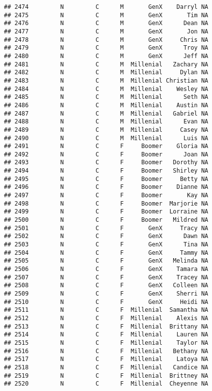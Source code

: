 \documentclass[
]{article}
\begin{document}
\begin{verbatim}
## 2474         N         C      M       GenX    Darryl NA
## 2475         N         C      M       GenX       Tim NA
## 2476         N         C      M       GenX      Dean NA
## 2477         N         C      M       GenX       Jon NA
## 2478         N         C      M       GenX     Chris NA
## 2479         N         C      M       GenX      Troy NA
## 2480         N         C      M       GenX      Jeff NA
## 2481         N         C      M  Millenial   Zachary NA
## 2482         N         C      M  Millenial     Dylan NA
## 2483         N         C      M  Millenial Christian NA
## 2484         N         C      M  Millenial    Wesley NA
## 2485         N         C      M  Millenial      Seth NA
## 2486         N         C      M  Millenial    Austin NA
## 2487         N         C      M  Millenial   Gabriel NA
## 2488         N         C      M  Millenial      Evan NA
## 2489         N         C      M  Millenial     Casey NA
## 2490         N         C      M  Millenial      Luis NA
## 2491         N         C      F     Boomer    Gloria NA
## 2492         N         C      F     Boomer      Joan NA
## 2493         N         C      F     Boomer   Dorothy NA
## 2494         N         C      F     Boomer   Shirley NA
## 2495         N         C      F     Boomer     Betty NA
## 2496         N         C      F     Boomer    Dianne NA
## 2497         N         C      F     Boomer       Kay NA
## 2498         N         C      F     Boomer  Marjorie NA
## 2499         N         C      F     Boomer  Lorraine NA
## 2500         N         C      F     Boomer   Mildred NA
## 2501         N         C      F       GenX     Tracy NA
## 2502         N         C      F       GenX      Dawn NA
## 2503         N         C      F       GenX      Tina NA
## 2504         N         C      F       GenX     Tammy NA
## 2505         N         C      F       GenX   Melinda NA
## 2506         N         C      F       GenX    Tamara NA
## 2507         N         C      F       GenX    Tracey NA
## 2508         N         C      F       GenX   Colleen NA
## 2509         N         C      F       GenX    Sherri NA
## 2510         N         C      F       GenX     Heidi NA
## 2511         N         C      F  Millenial  Samantha NA
## 2512         N         C      F  Millenial    Alexis NA
## 2513         N         C      F  Millenial  Brittany NA
## 2514         N         C      F  Millenial    Lauren NA
## 2515         N         C      F  Millenial    Taylor NA
## 2516         N         C      F  Millenial   Bethany NA
## 2517         N         C      F  Millenial    Latoya NA
## 2518         N         C      F  Millenial   Candice NA
## 2519         N         C      F  Millenial  Brittney NA
## 2520         N         C      F  Millenial  Cheyenne NA
\end{verbatim}
\end{document}
